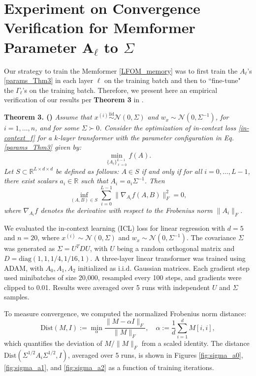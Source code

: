 \documentclass[11pt]{article}
\numberwithin{equation}{section}
\begin{document}
\section{Experiment on Convergence Verification for Memformer Parameter \( \mathbf{A}_\ell \) to \( \Sigma \)}

Our strategy to train the Memformer \eqref{LFOM_memory} was to first train the \( A_\ell \)'s \eqref{params_Thm3} in each layer \(\ell\) on the training batch and then to ``fine-tune" the \( \Gamma_\ell \)'s on the training batch. Therefore, we present here an empirical verification of our results per \textbf{Theorem 3} in \cite{ahn2024transformers}. 

\textbf{Theorem 3. (\cite{ahn2024transformers})} \textit{Assume that \( x^{(i)} \overset{\text{iid}}{\sim} \mathcal{N}(0, \Sigma) \) and \( w_x \sim \mathcal{N}(0, \Sigma^{-1}) \), for \( i = 1, \ldots, n \), and for some \( \Sigma \succ 0 \). Consider the optimization of in-context loss \eqref{in-context_f} for a \( k \)-layer transformer with the parameter configuration in Eq. \eqref{params_Thm3} given by:
\[
\min_{\{A_\ell\}_{\ell=0}^{L-1}} f(A).
\]
Let \( S \subset \mathbb{R}^{L \times d \times d} \) be defined as follows: \( A \in S \) if and only if for all \( i = 0, \ldots, L-1 \), there exist scalars \( a_i \in \mathbb{R} \) such that \( A_i = a_i \Sigma^{-1} \). Then
\[
\inf_{(A, B) \in S} \sum_{i=0}^{L-1} \|\nabla_{A_i} f(A, B)\|_F^2 = 0,
\]
where \( \nabla_{A_i} f \) denotes the derivative with respect to the Frobenius norm \( \|A_i\|_F \).}

We evaluated the in-context learning (ICL) loss for linear regression with \( d = 5 \) and \( n = 20 \), where \( x^{(i)} \sim \mathcal{N}(0, \Sigma) \) and \( w_x \sim \mathcal{N}(0, \Sigma^{-1}) \). The covariance \( \Sigma \) was generated as \( \Sigma = U^T D U \), with \( U \) being a random orthogonal matrix and \( D = \text{diag}(1, 1, 1/4, 1/16, 1) \). A three-layer linear transformer was trained using ADAM, with \( A_0, A_1, A_2 \) initialized as i.i.d. Gaussian matrices. Each gradient step used minibatches of size 20,000, resampled every 100 steps, and gradients were clipped to 0.01. Results were averaged over 5 runs with independent \( U \) and \( \Sigma \) samples.

To measure convergence, we computed the normalized Frobenius norm distance:
\[
\text{Dist}(M, I) := \min_{\alpha} \frac{\| M - \alpha I \|_F}{\| M \|_F}, \quad \alpha := \frac{1}{d} \sum_{i=1}^d M[i, i],
\]
which quantifies the deviation of \( M / \| M \|_F \) from a scaled identity. The distance \(\text{Dist}(\Sigma^{1/2} A_i \Sigma^{1/2}, I)\), averaged over 5 runs, is shown in Figures \ref{fig:sigma_a0}, \ref{fig:sigma_a1}, and \ref{fig:sigma_a2} as a function of training iterations.
\end{document}
